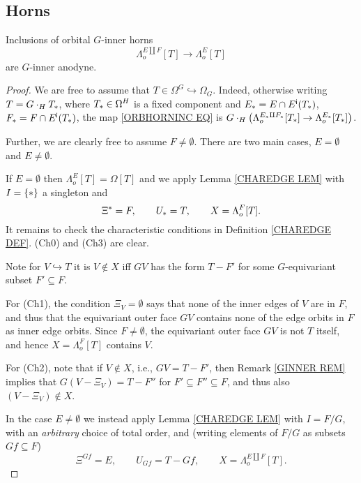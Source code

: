 \documentclass[a4paper,10pt,draft]{article}%
\begin{document}
\subsection{Horns}


\begin{proposition}\label{ORB_HORN_THM}
      Inclusions of orbital $G$-inner horns
\begin{equation}\label{ORBHORNINC EQ}
	\Lambda_o^{E \amalg F}[T] \to \Lambda_o^{E}[T]
\end{equation}
are $G$-inner anodyne.
\end{proposition}


\begin{proof}
We are free to assume that $T \in \Omega^G \hookrightarrow \Omega_G$. Indeed, otherwise writing $T = G \cdot_H T_{\**}$, where $T_{\**} \in \Omega^H$ is a fixed component and 
$E_{\**}=E \cap E^{\mathsf{i}}(T_{\**})$, $F_{\**} = F \cap E^{\mathsf{i}}(T_{\**})$,
the map \eqref{ORBHORNINC EQ} is
$G \cdot_H 
\left( \Lambda_o^{E_{\**} \amalg F_{\**}}[T_{\**}] \to \Lambda_o^{E_{\**}}[T_{\**}]\right)$.

Further, we are clearly free to assume $F \neq \emptyset$.
There are two main cases, 
$E=\emptyset$ and $E\neq \emptyset$.

If $E=\emptyset$ then $\Lambda_o^{E}[T] = \Omega[T]$ and we apply
Lemma \ref{CHAREDGE LEM} with $I = \{\**\}$ a singleton and
\[
	\Xi^{\**} = F, \qquad 
	U_{\**} = T,\qquad
	X=\Lambda_o^{F}[T].
\]
It remains to check the characteristic conditions in Definition \ref{CHAREDGE DEF}.
	(Ch0) and (Ch3) are clear.
	
	Note for $V\hookrightarrow T$ it is $V \not \in X$ iff 
	$GV$ has the form $T-F'$ for some $G$-equivariant subset
	$F' \subseteq F$.

	For (Ch1), the condition $\Xi_{V} = \emptyset$
	says that none of the inner edges of $V$ are in $F$,
	and thus that the equivariant outer face $G V$ contains none of the edge orbits in $F$ as inner edge orbits. Since $F\neq \emptyset$, the equivariant outer face $GV$ is not $T$ itself, 
	and hence $X=\Lambda_o^{F}[T]$ contains $V$.

	For (Ch2), note that if $V \not \in X$, i.e., 
	$GV = T - F'$, then Remark \ref{GINNER REM} implies that
	$G(V-\Xi_V) = T - F''$ for $F'\subseteq F'' \subseteq F$,
	and thus also $(V-\Xi_V) \not \in X$.
	
	In the case $E \neq \emptyset$ we instead apply Lemma \ref{CHAREDGE LEM} with $I = F/G$, with an 
	\textit{arbitrary} choice of total order, and 
	(writing elements of $F/G$ as subsets $Gf \subseteq F$)
\[
	\Xi^{Gf} = E, \qquad 
	U_{G f}= T - Gf, \qquad
	X=\Lambda_o^{E\amalg F}[T].
\]


\end{proof}
\end{document}
